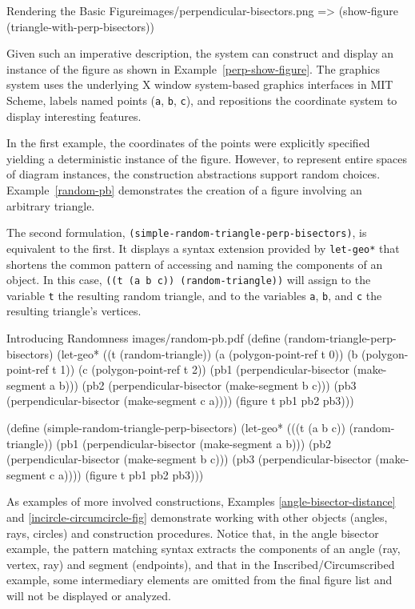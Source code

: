 \begin{img-example}
[label=perp-show-figure]
{Rendering the Basic Figure}{images/perpendicular-bisectors.png}
=> (show-figure (triangle-with-perp-bisectors))
\end{img-example}

Given such an imperative description, the system can construct and
display an instance of the figure as shown in
Example~\ref{perp-show-figure}. The graphics system uses the
underlying X window system-based graphics interfaces in MIT Scheme,
labels named points (\texttt{a}, \texttt{b}, \texttt{c}), and
repositions the coordinate system to display interesting features.

In the first example, the coordinates of the points were explicitly
specified yielding a deterministic instance of the figure. However, to
represent entire spaces of diagram instances, the construction
abstractions support random choices. Example~\ref{random-pb}
demonstrates the creation of a figure involving an arbitrary triangle.

The second formulation,
\texttt{(simple-random-triangle-perp-bisectors)}, is equivalent to the
first. It displays a syntax extension provided by \texttt{let-geo*}
that shortens the common pattern of accessing and naming the
components of an object. In this case, \texttt{((t (a b c))
    (random-triangle))} will assign to the variable \texttt{t} the
resulting random triangle, and to the variables \texttt{a},
\texttt{b}, and \texttt{c} the resulting triangle's vertices.

\begin{pdf-example}
[label=random-pb]
{Introducing Randomness}
{images/random-pb.pdf}
(define (random-triangle-perp-bisectors)
  (let-geo* ((t (random-triangle))
             (a (polygon-point-ref t 0))
             (b (polygon-point-ref t 1))
             (c (polygon-point-ref t 2))
             (pb1 (perpendicular-bisector (make-segment a b)))
             (pb2 (perpendicular-bisector (make-segment b c)))
             (pb3 (perpendicular-bisector (make-segment c a))))
    (figure t pb1 pb2 pb3)))

(define (simple-random-triangle-perp-bisectors)
  (let-geo* (((t (a b c)) (random-triangle))
             (pb1 (perpendicular-bisector (make-segment a b)))
             (pb2 (perpendicular-bisector (make-segment b c)))
             (pb3 (perpendicular-bisector (make-segment c a))))
    (figure t pb1 pb2 pb3)))
\end{pdf-example}

As examples of more involved constructions, Examples
\ref{angle-bisector-distance} and \ref{incircle-circumcircle-fig}
demonstrate working with other objects (angles, rays, circles) and
construction procedures. Notice that, in the angle bisector example,
the pattern matching syntax extracts the components of an angle (ray,
vertex, ray) and segment (endpoints), and that in the
Inscribed/Circumscribed example, some intermediary elements are
omitted from the final figure list and will not be displayed or
analyzed.

